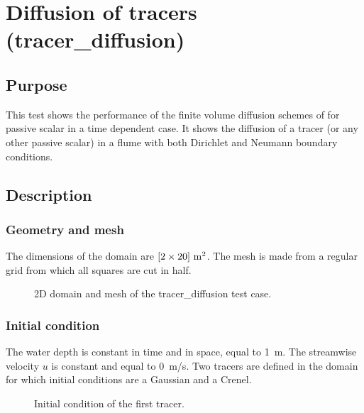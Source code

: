 \chapter{Diffusion of tracers (tracer\_diffusion)}

\section{Purpose}
This test shows the performance of the finite volume diffusion schemes of
 for passive scalar in a time dependent case.
It shows the diffusion of a tracer (or any other passive scalar) in a flume with
both Dirichlet and Neumann boundary conditions.

\section{Description}

\subsection{Geometry and mesh}

The dimensions of the domain are $[2 \times 20]~\rm{m}^2$.
The mesh is made from a regular grid from which all squares are cut in half.

\begin{figure}[h!]
\centering
{}
\caption{2D domain and mesh of the tracer\_diffusion test case.}
\label{t2d:tracerdiffusion:mesh}
\end{figure}

\subsection{Initial condition}

The water depth is constant in time and in space, equal to 1~m.
The streamwise velocity $u$ is constant and equal to 0~m/s.
Two tracers are defined in the domain for which initial conditions are
a Gaussian and a Crenel.

\begin{figure}[h!]
\centering
{}
\caption{Initial condition of the first tracer.}
\label{t2d:tracerdiffusion:mesh}
\end{figure}

